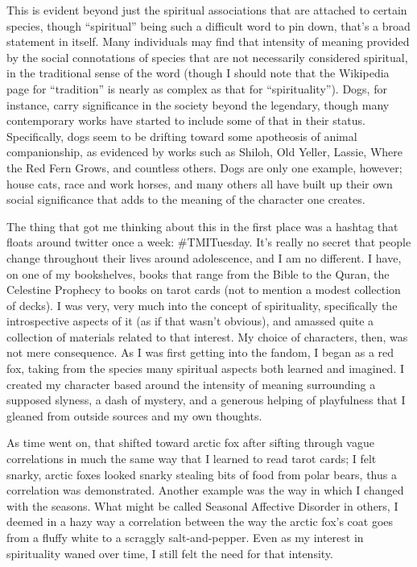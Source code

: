 This is evident beyond just the spiritual associations that are attached to certain species, though ``spiritual'' being such a difficult word to pin down, that's a broad statement in itself.  Many individuals may find that intensity of meaning provided by the social connotations of species that are not necessarily considered spiritual, in the traditional sense of the word (though I should note that the Wikipedia page for ``tradition'' is nearly as complex as that for ``spirituality'').  Dogs, for instance, carry significance in the society beyond the legendary, though many contemporary works have started to include some of that in their status. Specifically, dogs seem to be drifting toward some apotheosis of animal companionship, as evidenced by works such as Shiloh, Old Yeller, Lassie, Where the Red Fern Grows, and countless others.  Dogs are only one example, however; house cats, race and work horses, and many others all have built up their own social significance that adds to the meaning of the character one creates.

The thing that got me thinking about this in the first place was a hashtag that floats around twitter once a week: \#TMITuesday.  It's really no secret that people change throughout their lives around adolescence, and I am no different.  I have, on one of my bookshelves, books that range from the Bible to the Quran, the Celestine Prophecy to books on tarot cards (not to mention a modest collection of decks).  I was very, very much into the concept of spirituality, specifically the introspective aspects of it (as if that wasn't obvious), and amassed quite a collection of materials related to that interest.  My choice of characters, then, was not mere consequence.  As I was first getting into the fandom, I began as a red fox, taking from the species many spiritual aspects both learned and imagined.  I created my character based around the intensity of meaning surrounding a supposed slyness, a dash of mystery, and a generous helping of playfulness that I gleaned from outside sources and my own thoughts.

As time went on, that shifted toward arctic fox after sifting through vague correlations in much the same way that I learned to read tarot cards; I felt snarky, arctic foxes looked snarky stealing bits of food from polar bears, thus a correlation was demonstrated.  Another example was the way in which I changed with the seasons.  What might be called Seasonal Affective Disorder in others, I deemed in a hazy way a correlation between the way the arctic fox's coat goes from a fluffy white to a scraggly salt-and-pepper.  Even as my interest in spirituality waned over time, I still felt the need for that intensity.

